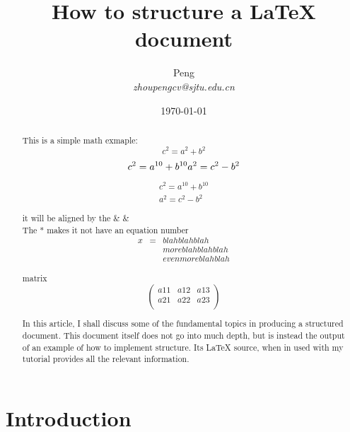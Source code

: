 \documentclass{article}
\begin{document}
\title{How to structure a \LaTeX{} document}
\author{Peng\\
\emph{zhoupengcv@sjtu.edu.cn}}
\date{\today}
\maketitle{}
\begin{abstract}

This is a simple math exmaple: $$c^2=a^2+b^2$$
\begin{equation}
  \label{eq:1}
  c^2=a^{10} + b^{10}\\
  a^2=c^2-b^2
\end{equation}

\begin{eqnarray}
  \label{eq:2}
  c^2=a^{10} + b^{10}\nonumber\\
  a^2=c^2-b^2
\end{eqnarray}

it will be aligned by the \& \& \\
The * makes it not have an equation number
\begin{eqnarray*}
    x &=& blah blah blah \\ 
      & & more blah blah blah \\
      & & even more blah blah
\end{eqnarray*}

matrix
\begin{equation}       %
\left(                 %
  \begin{array}{ccc}   %
    a11 & a12 & a13\\  %
    a21 & a22 & a23\\  %
  \end{array}
\right)                 %
\end{equation}

   In this article, I shall discuss some of the fundamental topics in
 producing a structured document.  This document itself does not go into
 much depth, but is instead the output of an example of how to implement
 structure. Its \LaTeX{} source, when in used with my tutorial
 provides all the relevant information.
\end{abstract}

\section{Introduction}
\label{sec:introduction}
\end{document}
